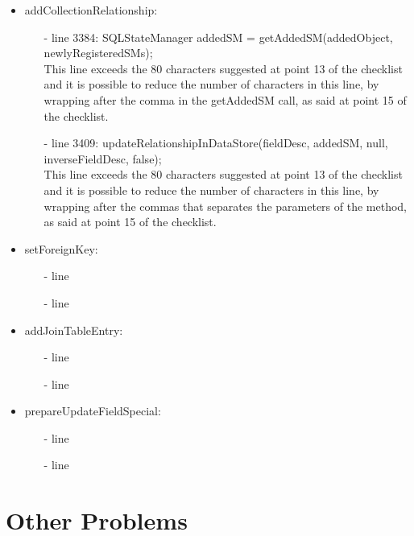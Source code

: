 \documentclass[18pt,oneside,a4paper, titlepage]{article}
\begin{document}
\begin{itemize}
\begin{itemize}
				
			\end{itemize}
		\item addCollectionRelationship:
			\begin{itemize}
				\item[-] line 3384:  SQLStateManager addedSM = getAddedSM(addedObject, newlyRegisteredSMs);\\
				This line exceeds the 80 characters suggested at point 13 of the checklist and it is possible to reduce the number of characters in this line, by wrapping after the comma in the getAddedSM call, as said at point 15 of the checklist.
				\item[-] line 3409: updateRelationshipInDataStore(fieldDesc, addedSM, null, inverseFieldDesc, false);\\
				This line exceeds the 80 characters suggested at point 13 of the checklist and it is possible to reduce the number of characters in this line, by wrapping after the commas that separates the parameters of the method, as said at point 15 of the checklist.
			\end{itemize}
		\item setForeignKey:
			\begin{itemize}
				\item[-] line 
				\item[-] line 
			\end{itemize}
		\item addJoinTableEntry:
		\begin{itemize}
			\item[-] line 
			\item[-] line 
		\end{itemize}
		\item prepareUpdateFieldSpecial:
		\begin{itemize}
			\item[-] line 
			\item[-] line 
		\end{itemize}
		
	\end{itemize}

\newpage
\section{Other Problems}
\end{document}
